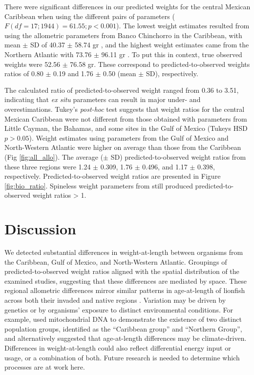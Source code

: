 \documentclass[12pt,]{article}
\theoremstyle{definition}
\theoremstyle{definition}
\theoremstyle{definition}
\theoremstyle{remark}
\begin{document}
There were significant differences in our predicted weights for the
central Mexican Caribbean when using the different pairs of parameters
(\(F(df = 17; 1944) = 61.55; p < 0.001\)). The lowest weight estimates
resulted from using the allometric parameters from Banco Chinchorro in
the Caribbean, with mean \(\pm\) SD of 40.37 \(\pm\) 58.74 gr
\citep{sabidoitz_2016}, and the highest weight estimates came from the
Northern Atlantic with 73.76 \(\pm\) 96.11 gr \citep{barbour_2011}. To
put this in context, true observed weights were 52.56 \(\pm\) 76.58 gr.
These correspond to predicted-to-observed weights ratios of 0.80 \(\pm\)
0.19 and 1.76 \(\pm\) 0.50 (mean \(\pm\) SD), respectively.

The calculated ratio of predicted-to-observed weight ranged from 0.36 to
3.51, indicating that \emph{ex situ} parameters can result in major
under- and overestimations. Tukey's \emph{post-hoc} test suggests that
weight ratios for the central Mexican Caribbean were not different from
those obtained with parameters from Little Cayman, the Bahamas, and some
sites in the Gulf of Mexico (Tukeys HSD \(p > 0.05\)). Weight estimates
using parameters from the Gulf of Mexico and North-Western Atlantic were
higher on average than those from the Caribbean (Fig
\ref{fig:all_allo}). The average (\(\pm\) SD) predicted-to-observed
weight ratios from these three regions were 1.24 \(\pm\) 0.309, 1.76
\(\pm\) 0.496, and 1.17 \(\pm\) 0.398, respectively.
Predicted-to-observed weight ratios are presented in Figure
\ref{fig:bio_ratio}. Spineless weight parameters from \citet{fogg_2013}
still produced predicted-to-observed weight ratios \textgreater{} 1.

\section{Discussion}\label{discussion}

We detected substantial differences in weight-at-length between
organisms from the Caribbean, Gulf of Mexico, and North-Western
Atlantic. Groupings of predicted-to-observed weight ratios aligned with
the spatial distribution of the examined studies, suggesting that these
differences are mediated by space. These regional allometric differences
mirror similar patterns in age-at-length of lionfish across both their
invaded and native regions \citep{pusack_2016}. Variation may be driven
by genetics or by organisms' exposure to distinct environmental
conditions. For example, \citet{betancurr_2011} used mitochondrial DNA
to demonstrate the existence of two distinct population groups,
identified as the ``Caribbean group'' and ``Northern Group'', and
\citet{fogg_2015} alternatively suggested that age-at-length differences
may be climate-driven. Differences in weight-at-length could also
reflect differential energy input or usage, or a combination of both.
Future research is needed to determine which processes are at work here.
\end{document}
